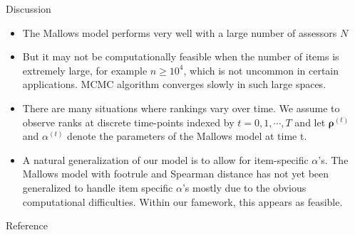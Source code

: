 \documentclass[11pt]{beamer}
\begin{document}
\begin{frame}{Discussion}
\begin{itemize}
    \item The Mallows model performs very well with a large number of assessors $N$
    \item But it may not be computationally feasible when the number of items is extremely large, for example $n\geq 10^4$, which is not uncommon in certain applications. MCMC algorithm converges slowly in such large spaces.
    \item There are many situations where rankings vary over time. We assume to observe ranks at discrete time-points indexed by $t=0,1,\cdots, T$ and let $\boldsymbol{\rho}^{(t)}$ and $\alpha^{(t)}$ denote the parameters of the Mallows model at time t.
    \item A natural generalization of our model is to allow for item-specific $\alpha$'s. The Mallows model with footrule and Spearman distance has not yet been generalized to handle item specific $\alpha$'s mostly due to the obvious computational difficulties. Within our famework, this appears as feasible.  
\end{itemize}
\end{frame}



\begin{frame}{Reference}
    \nocite{vitelli2017probabilistic}
    
\end{frame}
\end{document}
